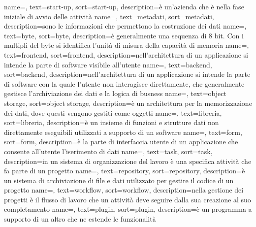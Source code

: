 {
  name=,
  text=start-up,
  sort=start-up,
  description={è un'azienda che è nella fase iniziale di avvio delle attività}
}
{
  name=,
  text=metadati,
  sort=metadati,
  description={sono le informazioni che permettono la costruzione dei dati}
}
{
  name=,
  text=byte,
  sort=byte,
  description={è generalmente una sequenza di 8 bit. Con i multipli del byte si identifica l'unità di misura della capacità di memoria}
}
{
  name=,
  text=frontend,
  sort=frontend,
  description={nell'architettura di un applicazione si intende la parte di software visibile all'utente}
}
{
  name=,
  text=backend,
  sort=backend,
  description={nell'architettura di un applicazione si intende la parte di software con la quale l'utente non interagisce direttamente, che generalmente gestisce l'archiviazione dei dati e la  logica di busness}
}
{
  name=,
  text=object storage,
  sort=object storage,
  description={è un architettura per la memorizzazione dei dati, dove questi vengono gestiti come oggetti}
}
{
  name=,
  text=libreria,
  sort=libreria,
  description={è un insieme di funzioni e strutture dati non direttamente eseguibili utilizzati a supporto di un software}
}
{
  name=,
  text=form,
  sort=form,
  description={è la parte di interfaccia utente di un applicazione che consente all'utente l'iserimento di dati}
}
{
  name=,
  text=task,
  sort=task,
  description={in un sistema di organizzazione del lavoro è una specifica attività che fa parte di un progetto}
}
{
  name=,
  text=repository,
  sort=repository,
  description={è un sistema di archiviazione di file e dati utilizzato per gestire il codice di un progetto}
}
{
  name=,
  text=workflow,
  sort=workflow,
  description={nella gestione dei progetti è il flusso di lavoro che un attività deve seguire dalla sua creazione al suo completamento}
}
{
  name=,
  text=plugin,
  sort=plugin,
  description={è un programma a supporto di un altro che ne estende le funzionalità}
}
